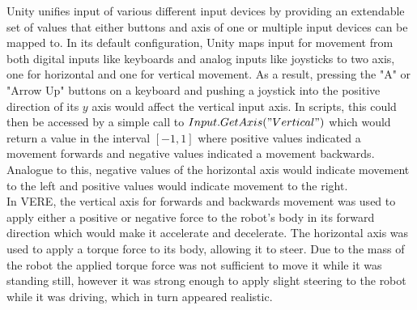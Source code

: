 Unity unifies input of various different input devices by providing an extendable set of values that either buttons and axis of one or multiple input devices can be mapped to. In its default configuration, Unity maps input for movement from both digital inputs like keyboards and analog inputs like joysticks to two axis, one for horizontal and one for vertical movement. As a result, pressing the "A" or "Arrow Up" buttons on a keyboard and pushing a joystick into the positive direction of its $y$ axis would affect the vertical input axis. In scripts, this could then be accessed by a simple call to $Input.GetAxis("Vertical")$ which would return a value in the interval $[-1, 1]$ where positive values indicated a movement forwards and negative values indicated a movement backwards. Analogue to this, negative values of the horizontal axis would indicate movement to the left and positive values would indicate movement to the right.\\
In \ac{VERE}, the vertical axis for forwards and backwards movement was used to apply either a positive or negative force to the robot's body in its forward direction which would make it accelerate and decelerate. The horizontal axis was used to apply a torque force to its body, allowing it to steer. Due to the mass of the robot the applied torque force was not sufficient to move it while it was standing still, however it was strong enough to apply slight steering to the robot while it was driving, which in turn appeared realistic.


